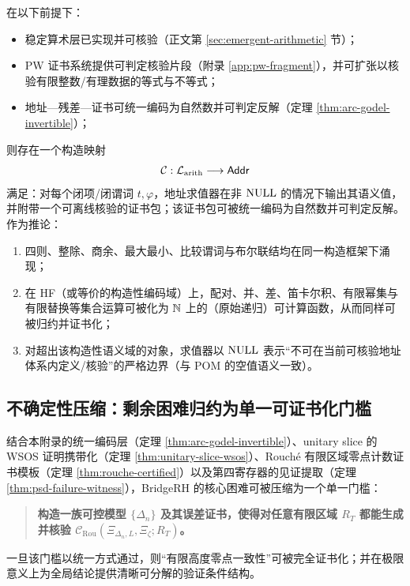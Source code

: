 \begin{theorem}\label{thm:unified-compilation}
在以下前提下：
\begin{itemize}
  \item 稳定算术层已实现并可核验（正文第 \ref{sec:emergent-arithmetic} 节）；
  \item PW 证书系统提供可判定核验片段（附录 \ref{app:pw-fragment}），并可扩张以核验有限整数/有理数据的等式与不等式；
  \item 地址—残差—证书可统一编码为自然数并可判定反解（定理 \ref{thm:arc-godel-invertible}）；
\end{itemize}
则存在一个构造映射
$$
\mathcal{C}:\mathcal{L}_{\mathrm{arith}}\longrightarrow \mathsf{Addr}
$$
满足：对每个闭项/闭谓词 $t,\varphi$，地址求值器在非 $\mathrm{NULL}$ 的情况下输出其语义值，并附带一个可离线核验的证书包；该证书包可被统一编码为自然数并可判定反解。作为推论：
\begin{enumerate}
  \item 四则、整除、商余、最大最小、比较谓词与布尔联结均在同一构造框架下涌现；
  \item 在 HF（或等价的构造性编码域）上，配对、并、差、笛卡尔积、有限幂集与有限替换等集合运算可被化为 $\mathbb{N}$ 上的（原始递归）可计算函数，从而同样可被归约并证书化；
  \item 对超出该构造性语义域的对象，求值器以 $\mathrm{NULL}$ 表示“不可在当前可核验地址体系内定义/核验”的严格边界（与 POM 的空值语义一致）。
\end{enumerate}
\end{theorem}

\subsection{不确定性压缩：剩余困难归约为单一可证书化门槛}\label{app:uncertainty-compression}

结合本附录的统一编码层（定理 \ref{thm:arc-godel-invertible}）、unitary slice 的 WSOS 证明携带化（定理 \ref{thm:unitary-slice-wsos}）、Rouché 有限区域零点计数证书模板（定理 \ref{thm:rouche-certified}）以及第四寄存器的见证提取（定理 \ref{thm:psd-failure-witness}），BridgeRH 的核心困难可被压缩为一个单一门槛：

\begin{quote}
\textbf{构造一族可控模型 $\{\Delta_n\}$ 及其误差证书，使得对任意有限区域 $R_T$ 都能生成并核验 $\mathcal{C}_{\mathrm{Rou}}(\Xi_{\Delta_n,L},\Xi_\zeta;R_T)$。}
\end{quote}

一旦该门槛以统一方式通过，则“有限高度零点一致性”可被完全证书化；并在极限意义上为全局结论提供清晰可分解的验证条件结构。

